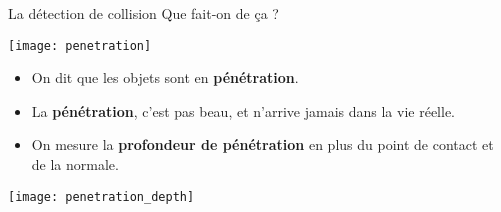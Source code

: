 \begin{frame}{La détection de collision}
    Que fait-on de ça ?
    \begin{center}
        \texttt{[image: penetration]}
    \end{center}
    \pause
    \begin{itemize}
        \item On dit que les objets sont en \textbf{pénétration}.
            \pause
        \item La \textbf{pénétration}, c’est pas beau, et n’arrive jamais dans
            la vie réelle.
            \pause
        \item On mesure la \textbf{profondeur de pénétration} en plus du point
            de contact et de la normale.
    \end{itemize}
    \begin{center}
        \texttt{[image: penetration\_depth]}
    \end{center}
\end{frame}

